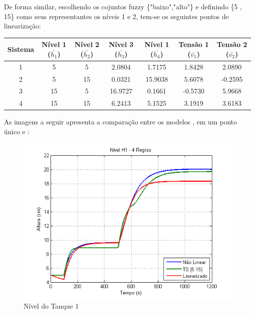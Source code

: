 De forma similar, escolhendo os cojuntos fuzzy \{"baixo","alto"\} e definindo \{5 , 15\} como seus representantes os níveis 1 e 2, tem-se os seguintes pontos de linearização:
\begin{center}
	\begin{tabular}{|c|c|c|c|c|c|c|}
		\hline
		Sistema & Nível 1 ($\bar{h_1}$) & Nível 2 ($\bar{h_2}$) & Nível 3 ($\bar{h_3}$) & Nível 1 ($\bar{h_4}$) & Tensão 1 ($\bar{v_1}$) & Tensão 2 ($\bar{v_2}$) \\ \hline
		1 & 5 & 5 & 2.0804 & 1.7175 & 1.8428 & 2.0890 \\ \hline
		2 & 5 & 15 & 0.0321 & 15.9038 & 5.6078 & -0.2595 \\ \hline
		3 & 15 & 5 & 16.9727 & 0.1661 & -0.5730 & 5.9668 \\ \hline
		4 & 15 & 15 & 6.2413 & 5.1525 & 3.1919 & 3.6183 \\	\hline
	\end{tabular}
\end{center}

As imagens a seguir apresenta a comparação entre os modelos ,  em um ponto único e :

\begin{figure}[H]
	\centering
	\includegraphics[width=\textwidth]{img/h1_ts2_nm.png}
	\caption{\small Nível do Tanque 1}
	\label{figH1TS2_nm}
\end{figure}

